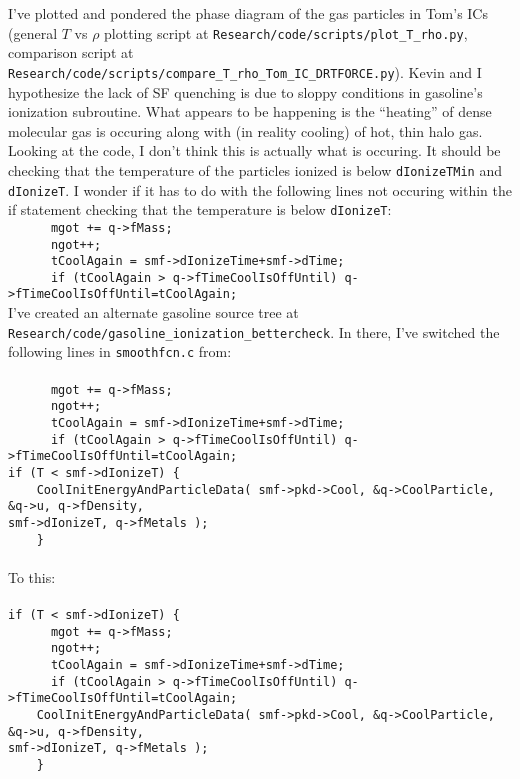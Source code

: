\documentclass[11pt,letterpaper]{article}
\begin{document}
I've plotted and pondered the phase diagram of the gas particles in Tom's ICs
(general $T$ vs $\rho$ plotting script at 
\verb!Research/code/scripts/plot_T_rho.py!, comparison script at \\
\verb!Research/code/scripts/compare_T_rho_Tom_IC_DRTFORCE.py!).  Kevin and I
hypothesize the lack of SF quenching is due to sloppy conditions in gasoline's
ionization subroutine.  What appears to be happening is the ``heating'' of 
dense molecular gas is occuring along with (in reality cooling) of hot, thin
halo gas.  Looking at the code, I don't think this is actually what is occuring.
It should be checking that the temperature of the particles ionized is below
\verb!dIonizeTMin! and \verb!dIonizeT!.  I wonder if it has to do with the 
following lines not occuring within the if statement checking that the
temperature is below \verb!dIonizeT!:\\
\verb!      mgot += q->fMass;!\\
\verb!      ngot++;!\\
\verb!      tCoolAgain = smf->dIonizeTime+smf->dTime;!\\
\verb!      if (tCoolAgain > q->fTimeCoolIsOffUntil) q->fTimeCoolIsOffUntil=tCoolAgain;!\\
I've created an alternate gasoline source tree at 
\verb!Research/code/gasoline_ionization_bettercheck!.  In there, I've
switched the following lines in \verb!smoothfcn.c! from:\\\\
\verb!      mgot += q->fMass;!\\
\verb!      ngot++;!\\
\verb!      tCoolAgain = smf->dIonizeTime+smf->dTime;!\\
\verb!      if (tCoolAgain > q->fTimeCoolIsOffUntil) q->fTimeCoolIsOffUntil=tCoolAgain;!\\
\verb!if (T < smf->dIonizeT) {!\\
\verb!	  CoolInitEnergyAndParticleData( smf->pkd->Cool, &q->CoolParticle, &q->u, q->fDensity, !\\
\verb!smf->dIonizeT, q->fMetals );!\\
\verb!	  }!\\\\
To this:\\\\
\verb!if (T < smf->dIonizeT) {!\\
\verb!      mgot += q->fMass;!\\
\verb!      ngot++;!\\
\verb!      tCoolAgain = smf->dIonizeTime+smf->dTime;!\\
\verb!      if (tCoolAgain > q->fTimeCoolIsOffUntil) q->fTimeCoolIsOffUntil=tCoolAgain;!\\
\verb!	  CoolInitEnergyAndParticleData( smf->pkd->Cool, &q->CoolParticle, &q->u, q->fDensity, !\\
\verb!smf->dIonizeT, q->fMetals );!\\
\verb!	  }!\\
\end{document}
